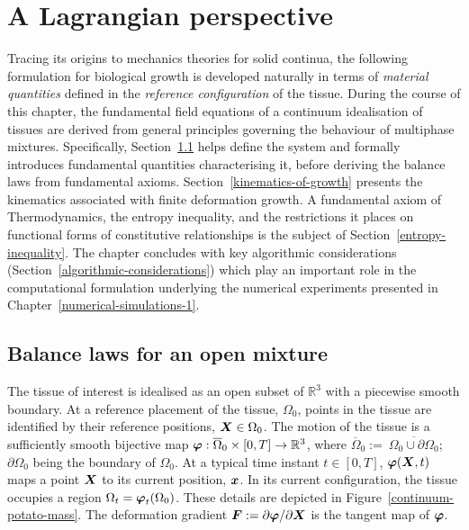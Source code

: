 \chapter{A Lagrangian perspective}
\label{lagrangian-perspective}

Tracing its origins to mechanics theories for solid continua, the
following formulation for biological growth is developed naturally in
terms of {\em material quantities} defined in the {\em reference
  configuration} of the tissue. During the course of this chapter, the
fundamental field equations of a continuum idealisation of tissues are
derived from general principles governing the behaviour of multiphase
mixtures. Specifically, Section~\ref{balance-laws} helps define the
system and formally introduces fundamental quantities characterising
it, before deriving the balance laws from fundamental
axioms. Section~\ref{kinematics-of-growth} presents the kinematics
associated with finite deformation growth. A fundamental axiom of
Thermodynamics, the entropy inequality, and the restrictions it places
on functional forms of constitutive relationships is the subject of
Section~\ref{entropy-inequality}. The chapter concludes with key
algorithmic considerations (Section~\ref{algorithmic-considerations})
which play an important role in the computational formulation
underlying the numerical experiments presented in
Chapter~\ref{numerical-simulations-1}.

\section{Balance laws for an open mixture}
\label{balance-laws}

The tissue of interest is idealised as an open subset of
$\mathbb{R}^3$ with a piecewise smooth boundary. At a reference
placement of the tissue, $\Omega_0$, points in the tissue are
identified by their reference positions, $\mbox{\boldmath$ X$} \in \Omega_0$. The
motion of the tissue is a sufficiently smooth bijective map $\mbox{\boldmath$\varphi$}:
\overline{\Omega}_0 \times [0,T] \rightarrow \mathbb{R}^3$, where
$\overline{\Omega}_0 :=\ \overline{\Omega_0\cup\partial\Omega_0}$;
$\partial\Omega_0$ being the boundary of $\Omega_0$. At a typical time
instant $t \in [0,T]$, $\mbox{\boldmath$\varphi$}(\mbox{\boldmath$ X$},t)$ maps a point $\mbox{\boldmath$ X$}$ to its
current position, $\mbox{\boldmath$ x$}$. In its current configuration, the tissue
occupies a region $\Omega_t = \mbox{\boldmath$\varphi$}_t (\Omega_0)$. These details
are depicted in Figure~\ref{continuum-potato-mass}. The deformation
gradient $\mbox{\boldmath$ F$} := \partial \mbox{\boldmath$\varphi$}/ \partial\mbox{\boldmath$ X$}$ is the tangent map of
$\mbox{\boldmath$\varphi$}$.

